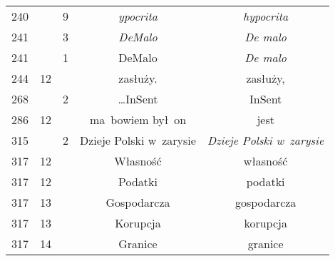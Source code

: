 \documentclass[a4paper,11pt]{article}
\begin{document}
\begin{center}
\begin{tabular}{|c|c|c|c|c|}
    240 & &  9 & \textit{ypocrita} & \textit{hypocrita} \\
    241 & &  3 & \textit{DeMalo} & \textit{De malo} \\
    241 & &  1 & DeMalo & \textit{De malo} \\
    244 & 12 & & zasłuży. & zasłuży, \\
    268 & &  2 & \ldots InSent & InSent \\
    286 & 12 & & ma~bowiem był~on & jest \\
    315 & &  2 & Dzieje Polski w~zarysie
    & \textit{Dzieje Polski w~zarysie} \\
    317 & 12 & & Własność & własność \\
    317 & 12 & & Podatki & podatki \\
    317 & 13 & & Gospodarcza & gospodarcza \\
    317 & 13 & & Korupcja & korupcja \\
    317 & 14 & & Granice & granice \\
    \hline
  \end{tabular}

\end{center}

\vspace{\spaceTwo}













\newpage


\vspace{0em}



\end{document}
